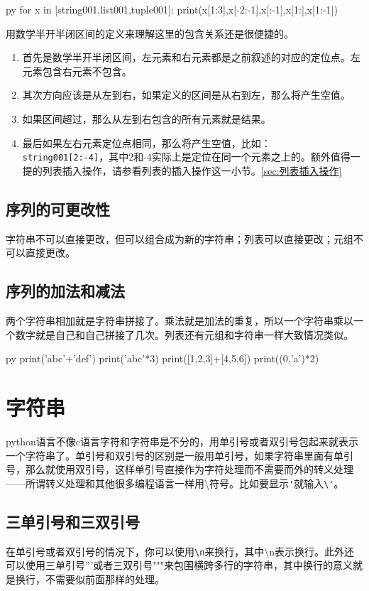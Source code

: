 \documentclass[12pt,oneside]{book}
\begin{document}
\begin{common-format}
\begin{xverbatim}[129]{py}
for x in [string001,list001,tuple001]:
    print(x[1:3],x[-2:-1],x[:-1],x[1:],x[1:-1])
\end{xverbatim}
用数学半开半闭区间的定义来理解这里的包含关系还是很便捷的。
\begin{enumerate}
\item 首先是数学半开半闭区间，左元素和右元素都是之前叙述的对应的定位点。左元素包含右元素不包含。
\item 其次方向应该是从左到右，如果定义的区间是从右到左，那么将产生空值。
\item 如果区间超过，那么从左到右包含的所有元素就是结果。
\item 最后如果左右元素定位点相同，那么将产生空值，比如：\\
\verb+string001[2:-4]+，其中2和-4实际上是定位在同一个元素之上的。额外值得一提的列表插入操作，请参看列表的插入操作这一小节。\ref{sec:列表插入操作}
\end{enumerate}


\subsection{序列的可更改性}
字符串不可以直接更改，但可以组合成为新的字符串；列表可以直接更改；元组不可以直接更改。



\subsection{序列的加法和减法}
两个字符串相加就是字符串拼接了。乘法就是加法的重复，所以一个字符串乘以一个数字就是自己和自己拼接了几次。列表还有元组和字符串一样大致情况类似。

\begin{xverbatim}[129]{py}
print('abc'+'def')
print('abc'*3)
print([1,2,3]+[4,5,6])
print((0,'a')*2)
\end{xverbatim}



\section{字符串}
python语言不像c语言字符和字符串是不分的，用单引号或者双引号包起来就表示一个字符串了。单引号和双引号的区别是一般用单引号，如果字符串里面有单引号，那么就使用双引号，这样单引号直接作为字符处理而不需要而外的转义处理——所谓转义处理和其他很多编程语言一样用\textbackslash 符号。比如要显示\verb+'+就输入\verb+\'+。

\subsection{三单引号和三双引号}
在单引号或者双引号的情况下，你可以使用\verb+\n+来换行，其中\textbackslash n表示换行。此外还可以使用三单引号'''或者三双引号"""来包围横跨多行的字符串，其中换行的意义就是换行，不需要似前面那样的处理。


\end{common-format}
\end{document}
